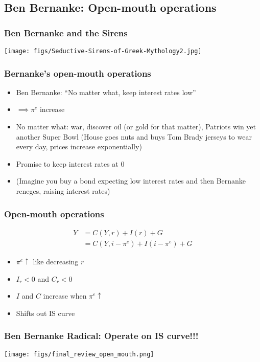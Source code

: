 \documentclass[presentation,dvipsnames]{beamer}
\begin{document}
\subsection{Ben Bernanke: Open-mouth operations}


\begin{frame}
\frametitle{Ben Bernanke and the Sirens}
\centerline{\texttt{[image: figs/Seductive-Sirens-of-Greek-Mythology2.jpg]}}
\end{frame}

\begin{frame}
\frametitle{Bernanke's open-mouth operations}
\begin{itemize}[label={--}]
\item Ben Bernanke: ``No matter what, keep interest rates low''
\item $\implies \pi^{e}$ increase
\item No matter what: war,
discover oil (or gold for that matter),
Patriots win yet another Super Bowl (House goes nuts and buys Tom Brady jerseys to wear every day,
prices increase exponentially)
\item Promise to keep interest rates at 0
\item (Imagine you buy a bond expecting low interest rates and then Bernanke reneges, raising interest rates)
\end{itemize}
\end{frame}

\begin{frame}
\frametitle{Open-mouth operations}
\begin{align*}
Y &= C(Y,r) + I(r) + G \\
&= C(Y, i - \pi^{e}) + I(i-\pi^{e}) + G
\end{align*}
\begin{itemize}[label={--}]
\item $\pi^{e} \uparrow$ like decreasing $r$
\item $I_{r} < 0$ and $C_{r} < 0$
\item $I$ and $C$ increase when $\pi^{e} \uparrow$
\item Shifts out IS curve
\end{itemize}
\end{frame}

\begin{frame}
\frametitle{Ben Bernanke Radical: Operate on IS curve!!!}
\centerline{\texttt{[image: figs/final\_review\_open\_mouth.png]}}
\end{frame}
\end{document}
